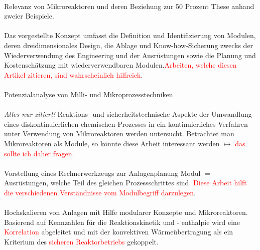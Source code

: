 \paragraph*{\cite{Grundemann_2012}} Relevanz von Mikroreaktoren und deren Beziehung zur 50 Prozent These anhand zweier Beispiele.

\paragraph*{\cite{Hady_2012}}
Das vorgestellte Konzept umfasst die Definition und Identifizierung von Modulen, deren dreidimensionales Design, die Ablage und Know-how-Sicherung zwecks der Wiederverwendung des Engineering und der Ausrüstungen sowie die Planung und Kostenschätzung mit wiederverwendbaren Modulen.\textcolor{red}{Arbeiten, welche diesen Artikel zitieren, sind wahrscheinlich hilfreich}.

\paragraph*{\cite{Hessel_2012}}Potenzialanalyse von Milli- und Mikroprozesstechniken

\paragraph*{\cite{Hugo2009}}
\textit{Alles nur zitiert!} \hfill \newline
Reaktions- und sicherheitstechnische Aspekte der Umwandlung eines diskontinuierlichen
chemischen Prozesses in ein kontinuierliches Verfahren unter Verwendung von Mikroreaktoren werden untersucht. Betrachtet man Mikroreaktoren als Module, so k\"onnte diese Arbeit interessant werden $\mapsto$ \textcolor{red}{das sollte ich daher fragen}. 

\paragraph*{\cite{Kampczyk_2003}}
Vorstellung eines Rechnerwerkzeugs zur Anlagenplanung \hfill \newline
Modul $=$ Ausr\"ustungen, welche Teil des gleichen Prozessschrittes sind. \textcolor{red}{Diese Arbeit hilft die verschiedenen Verst\"andnisse vom Modulbegriff darzulegen}.

\paragraph*{\cite{Kockmann_2012}} Hochskalieren von Anlagen mit Hilfe modularer Konzepte und Mikroreaktoren. \hfill \newline
Basierend auf Kennzahlen für die Reaktionskinetik und - enthalpie wird eine \textcolor{red}{Korrelation} abgeleitet und mit der konvektiven Wärmeübertragung als ein Kriterium des \textcolor{red}{sicheren Reaktorbetriebs} gekoppelt.

